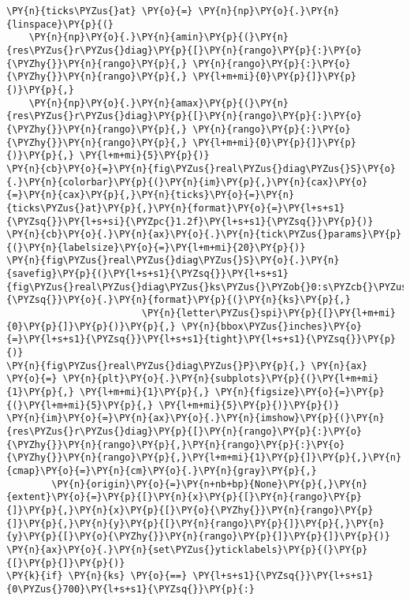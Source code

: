 \begin{Verbatim}[commandchars=\\\{\}]
\PY{n}{ticks\PYZus{}at} \PY{o}{=} \PY{n}{np}\PY{o}{.}\PY{n}{linspace}\PY{p}{(}
    \PY{n}{np}\PY{o}{.}\PY{n}{amin}\PY{p}{(}\PY{n}{res\PYZus{}r\PYZus{}diag}\PY{p}{[}\PY{n}{rango}\PY{p}{:}\PY{o}{\PYZhy{}}\PY{n}{rango}\PY{p}{,} \PY{n}{rango}\PY{p}{:}\PY{o}{\PYZhy{}}\PY{n}{rango}\PY{p}{,} \PY{l+m+mi}{0}\PY{p}{]}\PY{p}{)}\PY{p}{,}
    \PY{n}{np}\PY{o}{.}\PY{n}{amax}\PY{p}{(}\PY{n}{res\PYZus{}r\PYZus{}diag}\PY{p}{[}\PY{n}{rango}\PY{p}{:}\PY{o}{\PYZhy{}}\PY{n}{rango}\PY{p}{,} \PY{n}{rango}\PY{p}{:}\PY{o}{\PYZhy{}}\PY{n}{rango}\PY{p}{,} \PY{l+m+mi}{0}\PY{p}{]}\PY{p}{)}\PY{p}{,} \PY{l+m+mi}{5}\PY{p}{)}
\PY{n}{cb}\PY{o}{=}\PY{n}{fig\PYZus{}real\PYZus{}diag\PYZus{}S}\PY{o}{.}\PY{n}{colorbar}\PY{p}{(}\PY{n}{im}\PY{p}{,}\PY{n}{cax}\PY{o}{=}\PY{n}{cax}\PY{p}{,}\PY{n}{ticks}\PY{o}{=}\PY{n}{ticks\PYZus{}at}\PY{p}{,}\PY{n}{format}\PY{o}{=}\PY{l+s+s1}{\PYZsq{}}\PY{l+s+si}{\PYZpc{}1.2f}\PY{l+s+s1}{\PYZsq{}}\PY{p}{)}
\PY{n}{cb}\PY{o}{.}\PY{n}{ax}\PY{o}{.}\PY{n}{tick\PYZus{}params}\PY{p}{(}\PY{n}{labelsize}\PY{o}{=}\PY{l+m+mi}{20}\PY{p}{)}
\PY{n}{fig\PYZus{}real\PYZus{}diag\PYZus{}S}\PY{o}{.}\PY{n}{savefig}\PY{p}{(}\PY{l+s+s1}{\PYZsq{}}\PY{l+s+s1}{fig\PYZus{}real\PYZus{}diag\PYZus{}ks\PYZus{}\PYZob{}0:s\PYZcb{}\PYZus{}\PYZob{}1:s\PYZcb{}}\PY{l+s+s1}{\PYZsq{}}\PY{o}{.}\PY{n}{format}\PY{p}{(}\PY{n}{ks}\PY{p}{,}
                        \PY{n}{letter\PYZus{}spi}\PY{p}{[}\PY{l+m+mi}{0}\PY{p}{]}\PY{p}{)}\PY{p}{,} \PY{n}{bbox\PYZus{}inches}\PY{o}{=}\PY{l+s+s1}{\PYZsq{}}\PY{l+s+s1}{tight}\PY{l+s+s1}{\PYZsq{}}\PY{p}{)}
\PY{n}{fig\PYZus{}real\PYZus{}diag\PYZus{}P}\PY{p}{,} \PY{n}{ax} \PY{o}{=} \PY{n}{plt}\PY{o}{.}\PY{n}{subplots}\PY{p}{(}\PY{l+m+mi}{1}\PY{p}{,} \PY{l+m+mi}{1}\PY{p}{,} \PY{n}{figsize}\PY{o}{=}\PY{p}{(}\PY{l+m+mi}{5}\PY{p}{,} \PY{l+m+mi}{5}\PY{p}{)}\PY{p}{)}
\PY{n}{im}\PY{o}{=}\PY{n}{ax}\PY{o}{.}\PY{n}{imshow}\PY{p}{(}\PY{n}{res\PYZus{}r\PYZus{}diag}\PY{p}{[}\PY{n}{rango}\PY{p}{:}\PY{o}{\PYZhy{}}\PY{n}{rango}\PY{p}{,}\PY{n}{rango}\PY{p}{:}\PY{o}{\PYZhy{}}\PY{n}{rango}\PY{p}{,}\PY{l+m+mi}{1}\PY{p}{]}\PY{p}{,}\PY{n}{cmap}\PY{o}{=}\PY{n}{cm}\PY{o}{.}\PY{n}{gray}\PY{p}{,}
        \PY{n}{origin}\PY{o}{=}\PY{n+nb+bp}{None}\PY{p}{,}\PY{n}{extent}\PY{o}{=}\PY{p}{[}\PY{n}{x}\PY{p}{[}\PY{n}{rango}\PY{p}{]}\PY{p}{,}\PY{n}{x}\PY{p}{[}\PY{o}{\PYZhy{}}\PY{n}{rango}\PY{p}{]}\PY{p}{,}\PY{n}{y}\PY{p}{[}\PY{n}{rango}\PY{p}{]}\PY{p}{,}\PY{n}{y}\PY{p}{[}\PY{o}{\PYZhy{}}\PY{n}{rango}\PY{p}{]}\PY{p}{]}\PY{p}{)}
\PY{n}{ax}\PY{o}{.}\PY{n}{set\PYZus{}yticklabels}\PY{p}{(}\PY{p}{[}\PY{p}{]}\PY{p}{)}
\PY{k}{if} \PY{n}{ks} \PY{o}{==} \PY{l+s+s1}{\PYZsq{}}\PY{l+s+s1}{0\PYZus{}700}\PY{l+s+s1}{\PYZsq{}}\PY{p}{:}

\end{Verbatim}

